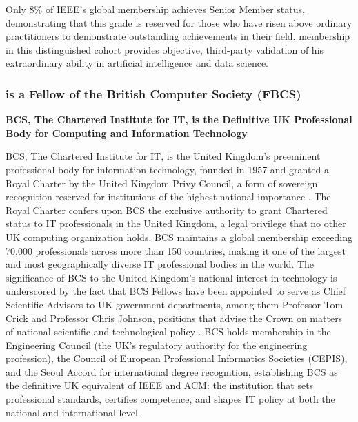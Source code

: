 Only 8\% of IEEE's global membership achieves Senior Member status, demonstrating that this grade is reserved for those who have risen above ordinary practitioners to demonstrate outstanding achievements in their field. \drs membership in this distinguished cohort provides objective, third-party validation of his extraordinary ability in artificial intelligence and data science.


\subsubsection{\dr is a Fellow of the British Computer Society (FBCS)}
\label{member:fbcs}

\textbf{BCS, The Chartered Institute for IT, is the Definitive UK Professional Body for Computing and Information Technology}

BCS, The Chartered Institute for IT, is the United Kingdom's preeminent professional body for information technology, founded in 1957 and granted a Royal Charter by the United Kingdom Privy Council, a form of sovereign recognition reserved for institutions of the highest national importance \cite{bcsroyalcharter}. The Royal Charter confers upon BCS the exclusive authority to grant Chartered status to IT professionals in the United Kingdom, a legal privilege that no other UK computing organization holds. BCS maintains a global membership exceeding 70,000 professionals across more than 150 countries, making it one of the largest and most geographically diverse IT professional bodies in the world. The significance of BCS to the United Kingdom's national interest in technology is underscored by the fact that BCS Fellows have been appointed to serve as Chief Scientific Advisors to UK government departments, among them Professor Tom Crick and Professor Chris Johnson, positions that advise the Crown on matters of national scientific and technological policy \cite{bcsannualreport}. BCS holds membership in the Engineering Council (the UK's regulatory authority for the engineering profession), the Council of European Professional Informatics Societies (CEPIS), and the Seoul Accord for international degree recognition, establishing BCS as the definitive UK equivalent of IEEE and ACM: the institution that sets professional standards, certifies competence, and shapes IT policy at both the national and international level.


